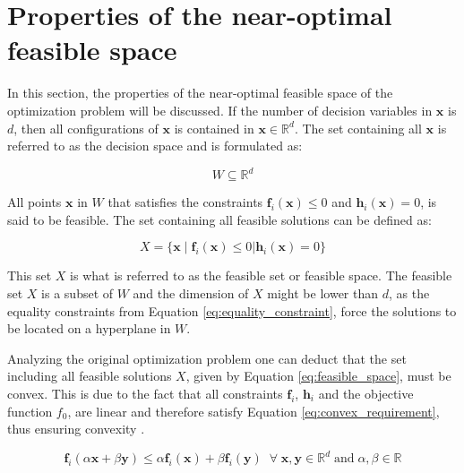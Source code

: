 

\section{Properties of the near-optimal feasible space}\label{sec:properties_of_hull}

In this section, the properties of the near-optimal feasible space of the optimization problem will be discussed. 
If the number of decision variables in $\mathbf{x}$ is $d$, then all configurations of $\mathbf{x}$ is contained in  $\mathbf{x}\in \mathbb{R}^d $. The set containing all  $\mathbf{x}$ is referred to as the decision space and is formulated as: 

\begin{equation}
W \subseteq \mathbb{R}^d 
\end{equation}

All points $\mathbf{x}$ in $W$ that satisfies the constraints $ \mathbf{f}_i(\mathbf{x}) \leq 0$ and $\mathbf{h}_i(\mathbf{x}) = 0$, is said to be feasible. The set containing all feasible solutions can be defined as: 

\begin{equation}\label{eq:feasible_space}
X = \{ \mathbf{x} \; | \; \mathbf{f}_i(\mathbf{x}) \leq 0 | \mathbf{h}_i(\mathbf{x}) = 0 \}
\end{equation}

This set $X$ is what is referred to as the feasible set or feasible space. The feasible set $X$ is a subset of $W$ and the dimension of $X$ might be lower than $d$, as the equality constraints from Equation \ref{eq:equality_constraint}, force the solutions to be located on a hyperplane in $W$. 

Analyzing the original optimization problem one can deduct that the set including all feasible solutions $X$, given by Equation \ref{eq:feasible_space}, must be convex. This is due to the fact that all constraints $\mathbf{f}_i$, $\mathbf{h}_i$ and the objective function $f_0$, are linear and therefore satisfy Equation \ref{eq:convex_requirement}, thus ensuring convexity \cite{ConvexOpimization}. 

\begin{equation}\label{eq:convex_requirement}
\mathbf{f}_i(\alpha \mathbf{x} + \beta \mathbf{y}) \leq \alpha \mathbf{f}_i(\mathbf{x}) + \beta \mathbf{f}_i(\mathbf{y}) \; \; \forall \; \mathbf{x}, \mathbf{y} \in \mathbb{R}^d \; \text{and}  \; \alpha, \beta \in \mathbb{R}
\end{equation}

